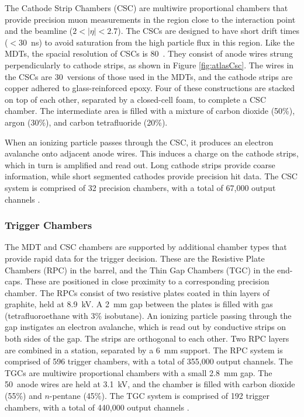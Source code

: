 The Cathode Strip Chambers (CSC) are multiwire proportional chambers that provide precision muon measurements in the region close to the interaction point and the beamline ($2<|\eta|<2.7$).
The CSCs are designed to have short drift times ($<30$~ns) to avoid saturation from the high particle flux in this region.
Like the MDTs, the spacial resolution of CSCs is 80~\um.
They consist of anode wires strung perpendicularly to cathode strips, as shown in Figure \ref{fig:atlasCsc}.
The wires in the CSCs are 30~\um versions of those used in the MDTs, and the cathode strips are copper adhered to glass-reinforced epoxy.
Four of these constructions are stacked on top of each other, separated by a closed-cell foam, to complete a CSC chamber.
The intermediate area is filled with a mixture of carbon dioxide (50\%), argon (30\%), and carbon tetrafluoride (20\%).

When an ionizing particle passes through the CSC, it produces an electron avalanche onto adjacent anode wires.
This induces a charge on the cathode strips, which in turn is amplified and read out.
Long cathode strips provide coarse information, while short segmented cathodes provide precision hit data.
The CSC system is comprised of 32 precision chambers, with a total of 67,000 output channels  \cite{muonTdr}.

\subsubsection{Trigger Chambers}

The MDT and CSC chambers are supported by additional chamber types that provide rapid data for the trigger decision.
These are the Resistive Plate Chambers (RPC) in the barrel, and the Thin Gap Chambers (TGC) in the end-caps.
These are positioned in close proximity to a corresponding precision chamber.
The RPCs consist of two resistive plates coated in thin layers of graphite, held at 8.9~kV.
A 2~mm gap between the plates is filled with gas (tetrafluoroethane with 3\% isobutane).
An ionizing particle passing through the gap instigates an electron avalanche, which is read out by conductive strips on both sides of the gap.
The strips are orthogonal to each other.
Two RPC layers are combined in a station, separated by a 6~mm support.
The RPC system is comprised of 596 trigger chambers, with a total of 355,000 output channels.
The TGCs are multiwire proportional chambers with a small 2.8~mm gap.
The 50~\um anode wires are held at 3.1~kV, and the chamber is filled with carbon dioxide (55\%) and $n$-pentane (45\%).
The TGC system is comprised of 192 trigger chambers, with a total of 440,000 output channels  \cite{muonTdr}.

